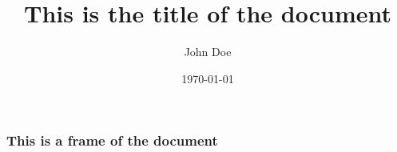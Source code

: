 \documentclass{beamer}
\begin{document}
\title{This is the title of the document}
\author{John Doe}
\date{\today}
\maketitle

\begin{frame}[t]\frametitle{This is a frame of the document}



\end{frame}


\end{document}
